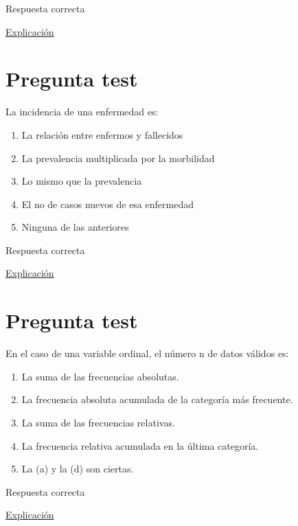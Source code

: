 \documentclass[
]{book}
\providecommand{\tightlist}{%
  \setlength{\itemsep}{0pt}\setlength{\parskip}{0pt}}
\begin{document}
Respuesta correcta

\href{https://www.salusplay.com/apuntes/apuntes-metodologia-de-la-investigacion/tema-4-el-proceso-de-investigacion-fases-de-realizacion-de-una-investigacion-cientifica/2}{Explicación}

\hypertarget{pregunta-test-5}{%
\section{Pregunta test}\label{pregunta-test-5}}

La incidencia de una enfermedad es:

\begin{enumerate}
\def\labelenumi{\alph{enumi})}
\tightlist
\item
  La relación entre enfermos y fallecidos
\item
  La prevalencia multiplicada por la morbilidad
\item
  Lo mismo que la prevalencia
\item
  El no de casos nuevos de esa enfermedad
\item
  Ninguna de las anteriores
\end{enumerate}

Respuesta correcta

\href{https://medlineplus.gov/spanish/ency/article/002387.htm}{Explicación}

\hypertarget{pregunta-test-6}{%
\section{Pregunta test}\label{pregunta-test-6}}

En el caso de una variable ordinal, el número n de datos válidos es:

\begin{enumerate}
\def\labelenumi{\alph{enumi})}
\tightlist
\item
  La suma de las frecuencias absolutas.
\item
  La frecuencia absoluta acumulada de la categoría más frecuente.
\item
  La suma de las frecuencias relativas.
\item
  La frecuencia relativa acumulada en la última categoría.
\item
  La (a) y la (d) son ciertas.
\end{enumerate}

Respuesta correcta

\href{https://1fjmanzano.github.io/bioestadistica/tablas-de-frecuencias.html}{Explicación}
\end{document}
